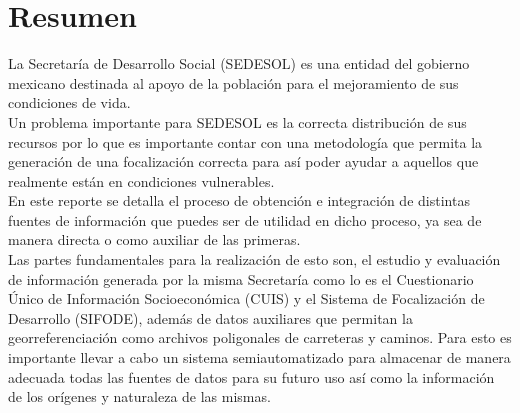 \section*{Resumen}
La Secretaría de Desarrollo Social (SEDESOL) es una entidad del gobierno mexicano destinada al apoyo de la población para el mejoramiento de sus condiciones de vida.\\
Un problema importante para SEDESOL es la correcta distribución de sus recursos por lo que es importante contar con una metodología que permita la generación de una focalización correcta para así poder ayudar a aquellos que realmente están en condiciones vulnerables.\\
En este reporte se detalla el proceso de obtención e integración de distintas fuentes de información que puedes ser de utilidad en dicho proceso, ya sea de manera directa o como auxiliar de las primeras.\\
Las partes fundamentales para la realización de esto son, el estudio y evaluación de información generada por la misma Secretaría como lo es el Cuestionario Único de Información Socioeconómica (CUIS) y el Sistema de Focalización de Desarrollo (SIFODE), además de datos auxiliares que permitan la georreferenciación como archivos poligonales de carreteras y caminos. Para esto es importante llevar a cabo un sistema semiautomatizado para almacenar de manera adecuada todas las fuentes de datos para su futuro uso así como la información de los orígenes y naturaleza de las mismas.
\clearpage

